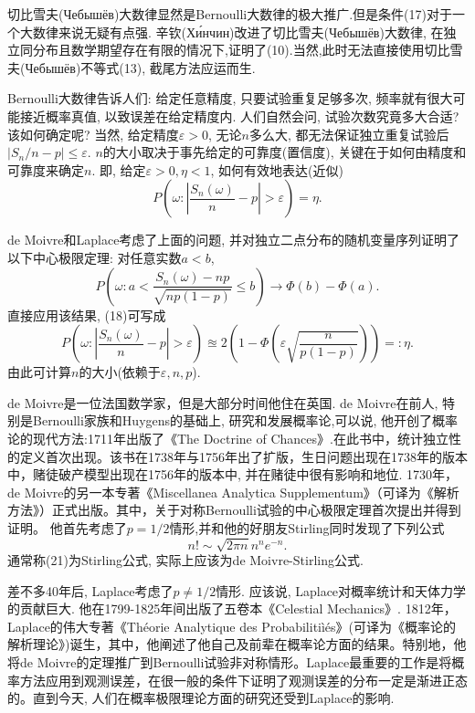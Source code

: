 \documentclass[a4paper,AutoFakeBold,oneside,12pt]{article}
\begin{document}
切比雪夫(Чебышёв)大数律显然是Bernoulli大数律的极大推广.但是条件(17)对于一个大数律来说无疑有点强. 辛钦(Хи́нчин)改进了切比雪夫(Чебышёв)大数律, 在独立同分布且数学期望存在有限的情况下,证明了(10).当然,此时无法直接使用切比雪夫(Чебышёв)不等式(13), 截尾方法应运而生.

Bernoulli大数律告诉人们: 给定任意精度, 只要试验重复足够多次, 频率就有很大可能接近概率真值, 以致误差在给定精度内. 人们自然会问, 试验次数究竟多大合适? 该如何确定呢? 当然, 给定精度$\varepsilon>0$, 无论$n$多么大, 都无法保证独立重复试验后$|S_n/n-p|\leqslant\varepsilon$. $n$的大小取决于事先给定的可靠度(置信度), 关键在于如何由精度和可靠度来确定$n$. 即, 给定$\varepsilon>0,\eta<1$, 如何有效地表达(近似)\begin{equation}
	P\left( \omega:\left| \frac{S_n(\omega)}{n}-p \right|>\varepsilon \right) = \eta.
\end{equation}

de Moivre和Laplace考虑了上面的问题, 并对独立二点分布的随机变量序列证明了以下中心极限定理: 对任意实数$a<b$,\begin{equation}
	P\left( \omega:a<\frac{S_n(\omega)-np}{\sqrt{np(1-p)}} \leqslant b  \right) \to \Phi(b)-\Phi(a).
\end{equation}
直接应用该结果, (18)可写成\begin{equation}
	P\left( \omega:\left| \frac{S_n(\omega)}{n}-p \right|>\varepsilon \right) \approxeq 2\left( 1-\Phi\left(\varepsilon\sqrt{\frac{n}{p(1-p)}}\right) \right)=: \eta.
\end{equation}
由此可计算$n$的大小(依赖于$\varepsilon,n,p$).

de Moivre是一位法国数学家，但是大部分时间他住在英国. de Moivre在前人, 特别是Bernoulli家族和Huygens的基础上, 研究和发展概率论,可以说, 他开创了概率论的现代方法:1711年出版了《The Doctrine of Chances》.在此书中，统计独立性的定义首次出现。该书在1738年与1756年出了扩版，生日问题出现在1738年的版本中，赌徒破产模型出现在1756年的版本中, 并在赌徒中很有影响和地位.
1730年，de Moivre的另一本专著《Miscellanea Analytica Supplementum》（可译为《解析方法》）正式出版。其中，关于对称Bernoulli试验的中心极限定理首次提出并得到证明。
他首先考虑了$p=1/2$情形,并和他的好朋友Stirling同时发现了下列公式\begin{equation}
	n!\sim \sqrt{2\pi n}n^ne^{-n}.
\end{equation}
通常称(21)为Stirling公式, 实际上应该为de Moivre-Stirling公式.

差不多40年后, Laplace考虑了$p\neq 1/2$情形. 应该说, Laplace对概率统计和天体力学的贡献巨大. 他在1799-1825年间出版了五卷本《Celestial Mechanics》.
1812年，Laplace的伟大专著《Théorie Analytique des Probabilitiìés》(可译为《概率论的解析理论》)诞生，其中，他阐述了他自己及前辈在概率论方面的结果。特别地，他将de Moivre的定理推广到Bernoulli试验非对称情形。Laplace最重要的工作是将概率方法应用到观测误差，在很一般的条件下证明了观测误差的分布一定是渐进正态的。直到今天, 人们在概率极限理论方面的研究还受到Laplace的影响.
\end{document}

